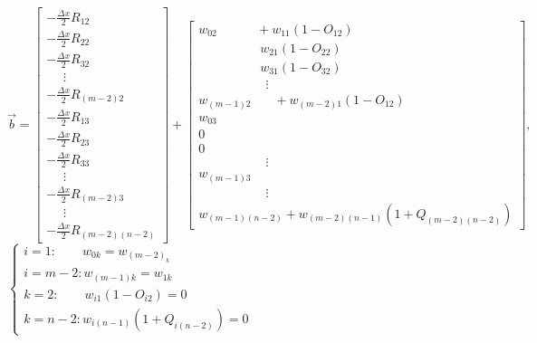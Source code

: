 \documentclass[a4paper,fleqn,10pt]{report}
\begin{document}
\begin{CJK*}{UTF8}{bsmi}
\quad
$
\vec{b} =
\left[\begin{array}{l}
        -\frac{\Delta x}{2}R_{12}       \\
        -\frac{\Delta x}{2}R_{22}       \\
        -\frac{\Delta x}{2}R_{32}       \\
	~~~~~~\vdots                    \\
	-\frac{\Delta x}{2}R_{(m-2)2}   \\
        -\frac{\Delta x}{2}R_{13}       \\
        -\frac{\Delta x}{2}R_{23}       \\
        -\frac{\Delta x}{2}R_{33}       \\
        ~~~~~~\vdots                    \\
        -\frac{\Delta x}{2}R_{(m-2)3}   \\
        ~~~~~~\vdots                    \\
        -\frac{\Delta x}{2}R_{(m-2)(n-2)}
\end{array}\right]
+
\left[\begin{array}{l}
        w_{02} ~~~~~~~~~~~~~~+ w_{11}(1-O_{12})     \\
        ~~~~~~~~~~~~~~~~~~~~~~ w_{21}(1-O_{22})    \\
        ~~~~~~~~~~~~~~~~~~~~~~ w_{31}(1-O_{32})    \\
	~~~~~~~~~~~~~~~~~~~~~~~~\vdots~~~~~~~~~  \\
	w_{(m-1)2} ~~~~~~~~+ w_{(m-2)1}(1-O_{12}) \\
        w_{03} 						  \\
        			0				  \\
       				0				  \\
        ~~~~~~~~~~~~~~~~~~~~~~~~\vdots~~~~~~~~~  \\
        w_{(m-1)3}						  \\
        ~~~~~~~~~~~~~~~~~~~~~~~~\vdots~~~~~~~~~  \\
        w_{(m-1)(n-2)} + w_{(m-2)(n-1)}(1+Q_{(m-2)(n-2)})
\end{array}\right], 
$\\

$
\begin{cases}
i = 1:\qquad w_{0k} = w_{(m-2)_k}\\
i = m-2: w_{(m-1)k} = w_{1k}\\
k = 2:\qquad w_{i1}(1-O_{i2}) = 0\\
k = n-2: w_{i(n-1)}(1+Q_{i(n-2)}) = 0
\end{cases}
$\\


\end{CJK*}
\end{document}
